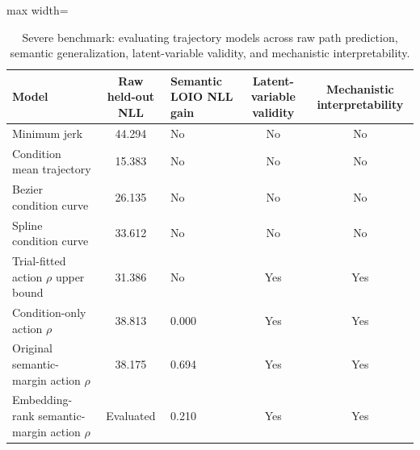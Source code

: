 \begin{table}[htbp]
\centering
\caption{Severe benchmark: evaluating trajectory models across raw path prediction, semantic generalization, latent-variable validity, and mechanistic interpretability.}
\label{tab:severe-benchmark}
\scriptsize
\begin{adjustbox}{max width=\textwidth}
\begin{tabular}{lclcc}
\toprule
Model & Raw held-out NLL & Semantic LOIO NLL gain & Latent-variable validity & Mechanistic interpretability \\
\midrule
Minimum jerk & 44.294 & No & No & No \\
Condition mean trajectory & 15.383 & No & No & No \\
Bezier condition curve & 26.135 & No & No & No \\
Spline condition curve & 33.612 & No & No & No \\
Trial-fitted action $\rho$ upper bound & 31.386 & No & Yes & Yes \\
Condition-only action $\rho$ & 38.813 & 0.000 & Yes & Yes \\
Original semantic-margin action $\rho$ & 38.175 & 0.694 & Yes & Yes \\
Embedding-rank semantic-margin action $\rho$ & Evaluated & 0.210 & Yes & Yes \\
\bottomrule
\end{tabular}
\end{adjustbox}
\end{table}
